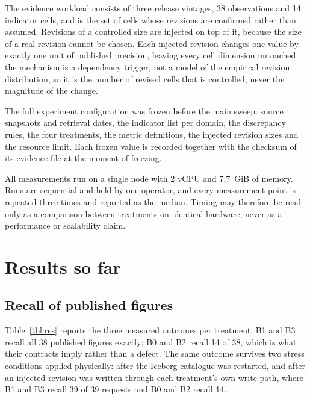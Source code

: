 \documentclass[a4paper,fleqn]{cas-dc}
\begin{document}
The evidence workload consists of three release vintages, 38 observations and 14
indicator cells, and is the set of cells whose revisions are confirmed rather
than assumed. Revisions of a controlled size are injected on top of it, because
the size of a real revision cannot be chosen. Each injected revision changes one
value by exactly one unit of published precision, leaving every cell dimension
untouched; the mechanism is a dependency trigger, not a model of the empirical
revision distribution, so it is the number of revised cells that is controlled,
never the magnitude of the change.

The full experiment configuration was frozen before the main sweep: source
snapshots and retrieval dates, the indicator list per domain, the discrepancy
rules, the four treatments, the metric definitions, the injected revision sizes
and the resource limit. Each frozen value is recorded together with the checksum
of its evidence file at the moment of freezing.

All measurements run on a single node with 2 vCPU and 7.7~GiB of memory. Runs
are sequential and held by one operator, and every measurement point is repeated
three times and reported as the median. Timing may therefore be read only as a
comparison between treatments on identical hardware, never as a performance or
scalability claim.

\section{Results so far}\label{sec:results}

\subsection{Recall of published figures}

Table~\ref{tbl:res} reports the three measured outcomes per treatment. B1 and B3
recall all 38 published figures exactly; B0 and B2 recall 14 of 38, which is
what their contracts imply rather than a defect. The same outcome survives two
stress conditions applied physically: after the Iceberg catalogue was restarted,
and after an injected revision was written through each treatment's own write
path, where B1 and B3 recall 39 of 39 requests and B0 and B2 recall 14.
\end{document}

